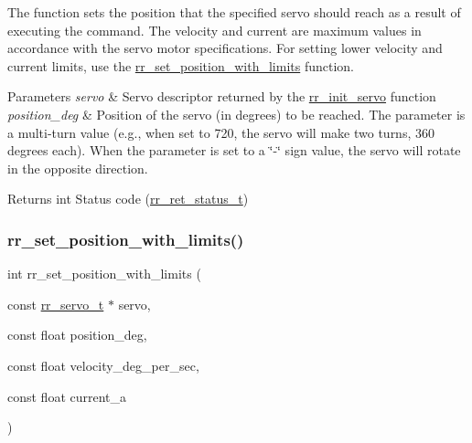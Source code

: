 The function sets the position that the specified servo should reach as a result of executing the command. The velocity and current are maximum values in accordance with the servo motor specifications. For setting lower velocity and current limits, use the \hyperlink{group___servo__control_ga6927d2a1d6ef5a0564b676817c88b82a}{rr\+\_\+set\+\_\+position\+\_\+with\+\_\+limits} function. 


\begin{DoxyParams}{Parameters}
{\em servo} & Servo descriptor returned by the \hyperlink{group___common_ga0adb313a3eeb8a4399431e940a1f3e9e}{rr\+\_\+init\+\_\+servo} function \\
\hline
{\em position\+\_\+deg} & Position of the servo (in degrees) to be reached. The parameter is a multi-\/turn value (e.\+g., when set to 720, the servo will make two turns, 360 degrees each). When the parameter is set to a \char`\"{}-\/\char`\"{} sign value, the servo will rotate in the opposite direction. \\
\hline
\end{DoxyParams}
\begin{DoxyReturn}{Returns}
int Status code (\hyperlink{api_8h_a92d5be5038abcf89837faf85a08debdc}{rr\+\_\+ret\+\_\+status\+\_\+t}) 
\end{DoxyReturn}
\mbox{\label{group___servo__control_ga6927d2a1d6ef5a0564b676817c88b82a}} 
\subsubsection{\texorpdfstring{rr\+\_\+set\+\_\+position\+\_\+with\+\_\+limits()}{rr\_set\_position\_with\_limits()}}
{\footnotesize\ttfamily int rr\+\_\+set\+\_\+position\+\_\+with\+\_\+limits (\begin{DoxyParamCaption}\item[{const \hyperlink{structrr__servo__t}{rr\+\_\+servo\+\_\+t} $\ast$}]{servo,  }\item[{const float}]{position\+\_\+deg,  }\item[{const float}]{velocity\+\_\+deg\+\_\+per\+\_\+sec,  }\item[{const float}]{current\+\_\+a }\end{DoxyParamCaption})}




